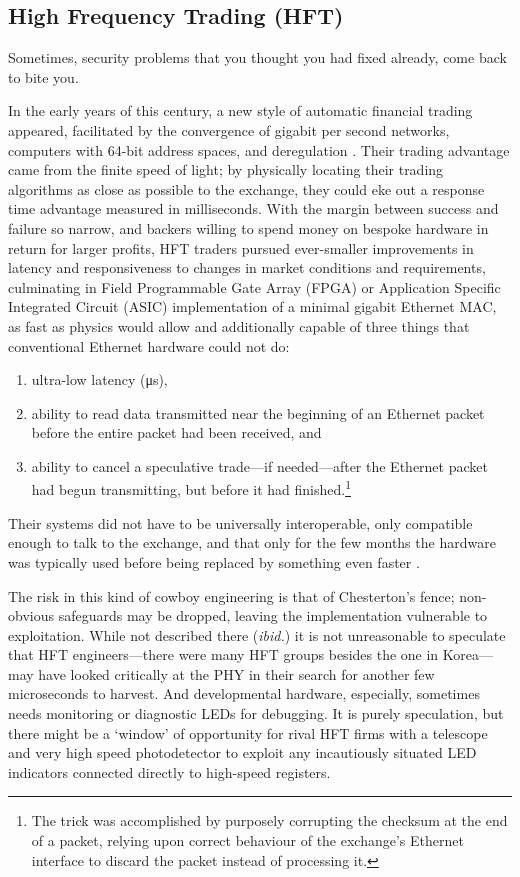 \documentclass[conference]{IEEEtran}
\begin{document}
\subsection{High Frequency Trading (HFT)}\label{section:HFT}

Sometimes, security problems that you thought you had fixed already, come
back to bite you.

In the early years of this century, a new style of automatic financial
trading appeared, facilitated by the convergence of gigabit per second
networks, computers with 64-bit address spaces, and deregulation
\cite{Lewis2014a}. Their trading advantage came from the finite speed of
light; by physically locating their trading algorithms as close as possible
to the exchange, they could eke out a response time advantage measured in
milliseconds. With the margin between success and failure so narrow, and
backers willing to spend money on bespoke hardware in return for larger
profits, HFT traders pursued ever-smaller improvements in latency and
responsiveness to changes in market conditions and requirements, culminating
in Field Programmable Gate Array (FPGA) or Application Specific
Integrated Circuit (ASIC) implementation of a minimal gigabit Ethernet MAC,
as fast as physics would allow and additionally capable of three things that
conventional Ethernet hardware could not do:

\begin{enumerate}
    \item ultra-low latency (\si{\micro\second}),
    \item ability to read data transmitted near the beginning of an Ethernet
        packet before the entire packet had been received, and
    \item ability to cancel a speculative trade---if needed---after the
        Ethernet packet had begun transmitting, but before it had
        finished.\footnote{The trick was accomplished by purposely corrupting
        the checksum at the end of a packet, relying upon correct behaviour
        of the exchange's Ethernet interface to discard the packet instead of
        processing it.}
\end{enumerate}

Their systems did not have to be universally interoperable, only compatible
enough to talk to the exchange, and that only for the few months the hardware
was typically used before being replaced by something even faster
\cite{Hurd2018a}.

The risk in this kind of cowboy engineering is that of Chesterton's fence;
non-obvious safeguards may be dropped, leaving the implementation vulnerable
to exploitation. While not described there ({\it ibid.}) it is not
unreasonable to speculate that HFT engineers---there were many HFT groups
besides the one in Korea---may have looked critically at the PHY in their
search for another few microseconds to harvest. And developmental hardware,
especially, sometimes needs monitoring or diagnostic LEDs for debugging. It
is purely speculation, but there might be a `window' of opportunity for rival
HFT firms with a telescope and very high speed photodetector to exploit any
incautiously situated LED indicators connected directly to high-speed
registers.
\end{document}
